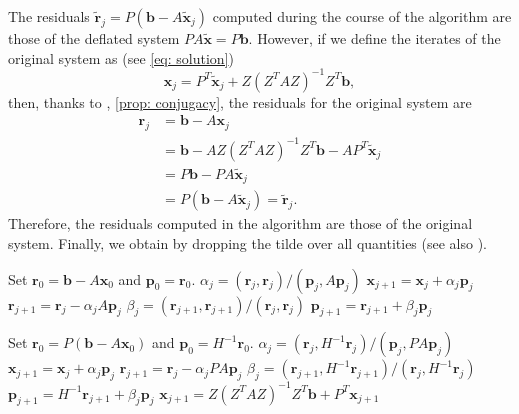 \documentclass{article}
\numberwithin{equation}{section}
\theoremstyle{definition}
\begin{document}
\begin{appendices}
\begin{itemize}[leftmargin=*, align=left, labelwidth=!]
\begin{equation*}
    \end{equation*}
\end{itemize}
The residuals $\tilde{\bm{r}}_j=P(\bm{b}-A\tilde{\bm{x}}_j)$ computed during the course of the algorithm are those of the deflated system $PA\bm{\tilde{x}}=P\bm{b}$. However, if we define the iterates of the original system as (see \eqref{eq: solution})
\begin{equation}
\label{eq: approximate_solution}
    \bm{x}_j = P^T \tilde{\bm{x}}_j + Z(Z^TAZ)^{-1}Z^T\bm{b},
\end{equation}
then, thanks to , \ref{prop: conjugacy}, the residuals for the original system are
\begin{align*}
    \bm{r}_j &= \bm{b}-A\bm{x}_j \\
    &=\bm{b}-AZ(Z^TAZ)^{-1}Z^T\bm{b}-AP^T\tilde{\bm{x}}_j \\
    &=P\bm{b}-PA\tilde{\bm{x}}_j \\
    &=P(\bm{b}-A\tilde{\bm{x}}_j)=\tilde{\bm{r}}_j.
\end{align*}
Therefore, the residuals computed in the algorithm are those of the original system. Finally, we obtain  by dropping the tilde over all quantities (see also \cite[Algorithm 6]{tang2008two}).


\begin{algorithm}[H]
\begin{algorithmic}[1]
\caption{Conjugate Gradient (CG) \cite[Algorithm 6.18]{saad2003iterative}}
\label{algo: cg}
\State Set $\bm{r}_0=\bm{b}-A\bm{x}_0$ and $\bm{p}_0=\bm{r}_0$.
    \State $\alpha_j = (\bm{r}_j,\bm{r}_j)/(\bm{p}_j,A\bm{p}_j)$
    \State $\bm{x}_{j+1}=\bm{x}_j+\alpha_j\bm{p}_j$
    \State $\bm{r}_{j+1}=\bm{r}_j-\alpha_jA\bm{p}_j$
    \State $\beta_j=(\bm{r}_{j+1},\bm{r}_{j+1})/(\bm{r}_j,\bm{r}_j)$
    \State $\bm{p}_{j+1}=\bm{r}_{j+1}+\beta_j \bm{p}_j$
\EndFor
\end{algorithmic}
\end{algorithm}


\begin{algorithm}[H]
\begin{algorithmic}[1]
\caption{Deflated Preconditioned Conjugate Gradient (DPCG) \cite[Algorithm 1]{vermolen2004deflation}}
\label{algo: dpcg_app}
\State Set $\bm{r}_0=P(\bm{b}-A\bm{x}_0)$ and $\bm{p}_0=H^{-1}\bm{r}_0$.
    \State $\alpha_j = (\bm{r}_j,H^{-1}\bm{r}_j)/(\bm{p}_j,PA\bm{p}_j)$
    \State $\bm{x}_{j+1}=\bm{x}_j+\alpha_j\bm{p}_j$
    \State $\bm{r}_{j+1}=\bm{r}_j-\alpha_jPA\bm{p}_j$
    \State $\beta_j=(\bm{r}_{j+1},H^{-1}\bm{r}_{j+1})/(\bm{r}_j,H^{-1}\bm{r}_j)$
    \State $\bm{p}_{j+1}=H^{-1}\bm{r}_{j+1}+\beta_j \bm{p}_j$
\EndFor
\State $\bm{x}_{j+1} = Z(Z^TAZ)^{-1}Z^T\bm{b} + P^T\bm{x}_{j+1}$
\end{algorithmic}
\end{algorithm}


\end{appendices}
\end{document}
